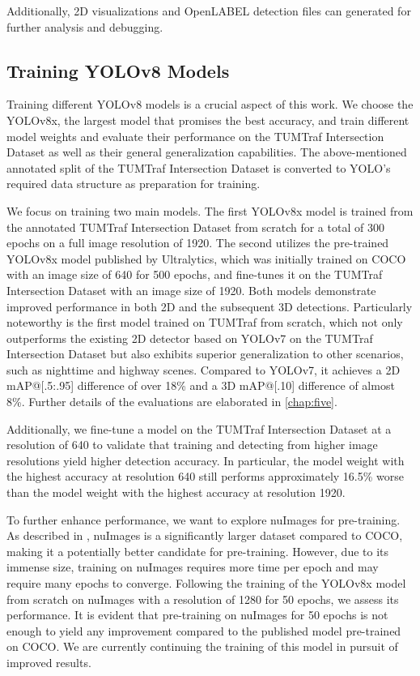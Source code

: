 Additionally, 2D visualizations and OpenLABEL detection files can generated for further analysis and debugging.

\subsection{Training YOLOv8 Models}

Training different YOLOv8 models is a crucial aspect of this work. We choose the YOLOv8x, the largest model that promises the best accuracy, and train different model weights and evaluate their performance on the TUMTraf Intersection Dataset as well as their general generalization capabilities. The above-mentioned annotated split of the TUMTraf Intersection Dataset is converted to YOLO's required data structure as preparation for training. 

We focus on training two main models. The first YOLOv8x model is trained from the annotated TUMTraf Intersection Dataset from scratch for a total of 300 epochs on a full image resolution of 1920. The second utilizes the pre-trained YOLOv8x model published by Ultralytics, which was initially trained on COCO with an image size of 640 for 500 epochs, and fine-tunes it on the TUMTraf Intersection Dataset with an image size of 1920. Both models demonstrate improved performance in both 2D and the subsequent 3D detections. Particularly noteworthy is the first model trained on TUMTraf from scratch, which not only outperforms the existing 2D detector based on YOLOv7 on the TUMTraf Intersection Dataset but also exhibits superior generalization to other scenarios, such as nighttime and highway scenes. Compared to YOLOv7, it achieves a 2D mAP@[.5:.95] difference of over 18\% and a 3D mAP@[.10] difference of almost 8\%. Further details of the evaluations are elaborated in \cref{chap:five}. 

Additionally, we fine-tune a model on the TUMTraf Intersection Dataset at a resolution of 640 to validate that training and detecting from higher image resolutions yield higher detection accuracy. In particular, the model weight with the highest accuracy at resolution 640 still performs approximately 16.5\% worse than the model weight with the highest accuracy at resolution 1920. 

To further enhance performance, we want to explore nuImages for pre-training. As described in , nuImages is a significantly larger dataset compared to COCO, making it a potentially better candidate for pre-training. However, due to its immense size, training on nuImages requires more time per epoch and may require many epochs to converge. Following the training of the YOLOv8x model from scratch on nuImages with a resolution of 1280 for 50 epochs, we assess its performance. It is evident that pre-training on nuImages for 50 epochs is not enough to yield any improvement compared to the published model pre-trained on COCO. We are currently continuing the training of this model in pursuit of improved results.

